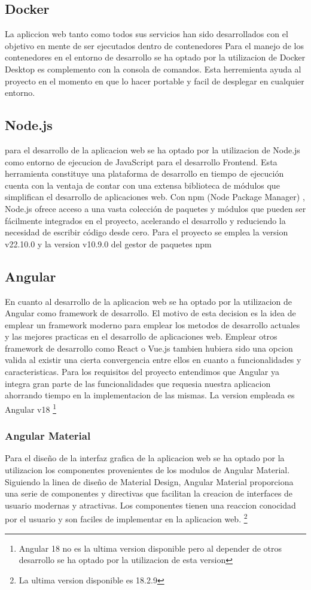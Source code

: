 \documentclass[12pt, a4paper, twoside]{article}
\begin{document}
\subsection{Docker}
La apliccion web tanto como todos sus servicios han sido desarrollados con el objetivo en mente de ser ejecutados dentro de contenedores
Para el manejo de los contenedores en el entorno de desarrollo se ha optado por la utilizacion de Docker Desktop es complemento con la consola de comandos.
Esta herremienta ayuda al proyecto en el momento en que lo hacer portable y facil de desplegar en cualquier entorno.
\subsection{Node.js}
\cite{nodejs}
para el desarrollo de la aplicacion web se ha optado por la utilizacion de Node.js como entorno de ejecucion de JavaScript para el desarrollo Frontend.
Esta herramienta constituye una plataforma de desarrollo en tiempo de ejecución cuenta con la ventaja de contar con una extensa biblioteca de módulos que simplifican el desarrollo de aplicaciones web.
Con npm (Node Package Manager) \cite{npm}, Node.js ofrece acceso a una vasta colección de paquetes y módulos que pueden ser fácilmente integrados en el proyecto, acelerando el desarrollo y reduciendo la necesidad de escribir código desde cero.
Para el proyecto se emplea la version v22.10.0 y la version v10.9.0 del gestor de paquetes npm
\subsection{Angular}
\cite{angular}
En cuanto al desarrollo de la aplicacion web se ha optado por la utilizacion de Angular como framework de desarrollo.
El motivo de esta decision es la idea de emplear un framework moderno para emplear los metodos de desarrollo actuales y las mejores practicas en el desarrollo de aplicaciones web.
Emplear otros framework de desarrollo como React o Vue.js tambien hubiera sido una opcion valida al existir una cierta convergencia entre ellos en cuanto a funcionalidades y caracteristicas.
Para los requisitos del proyecto entendimos que Angular ya integra gran parte de las funcionalidades que requesia nuestra aplicacion ahorrando tiempo en la implementacion de las mismas. La version empleada es Angular v18 \footnote{Angular 18 no es la ultima version disponible pero al depender de otros desarrollo se ha optado por la utilizacion de esta version}
\subsubsection{Angular Material}
\cite{angular_material}
Para el diseño de la interfaz grafica de la aplicacion web se ha optado por la utilizacion los componentes provenientes de los modulos de Angular Material.
Siguiendo la linea de diseño de Material Design, Angular Material proporciona una serie de componentes y directivas que facilitan la creacion de interfaces de usuario modernas y atractivas.
Los componentes tienen una reaccion conocidad por el usuario y son faciles de implementar en la aplicacion web. \footnote{La ultima version disponible es 18.2.9 }
\end{document}
